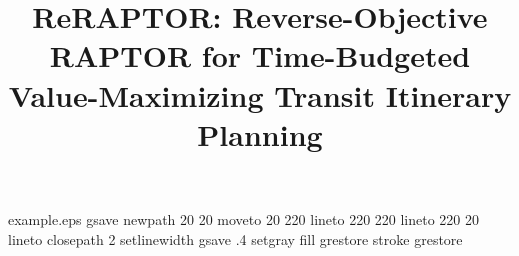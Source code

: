 %
%
%
%
%
\begin{filecontents*}{example.eps}
gsave
newpath
  20 20 moveto
  20 220 lineto
  220 220 lineto
  220 20 lineto
closepath
2 setlinewidth
gsave
  .4 setgray fill
grestore
stroke
grestore
\end{filecontents*}
%
\RequirePackage{fix-cm}
%
\documentclass[twocolumn]{svjour3}         %
%
\smartqed  %
%
%
%
\usepackage{graphicx}
\graphicspath{{../}{./}}
\usepackage{booktabs}
\usepackage{amsmath,amssymb}
\usepackage{algorithm}
\usepackage{algpseudocode}
\usepackage[hidelinks]{hyperref}
\usepackage{array}
\usepackage{enumitem}
\usepackage{microtype}
\usepackage{xspace}
\usepackage{CJKutf8}
\setlength{\textfloatsep}{10pt plus 2pt minus 2pt}
\setlength{\floatsep}{8pt plus 2pt minus 2pt}
\setlength{\intextsep}{8pt plus 2pt minus 2pt}
\emergencystretch=1.5em

\newcommand{\algname}{ReRAPTOR\xspace}
\newcommand{\ind}{\mathbb{I}}
%
%
%


\title{ReRAPTOR: Reverse-Objective RAPTOR for Time-Budgeted Value-Maximizing Transit Itinerary Planning}


